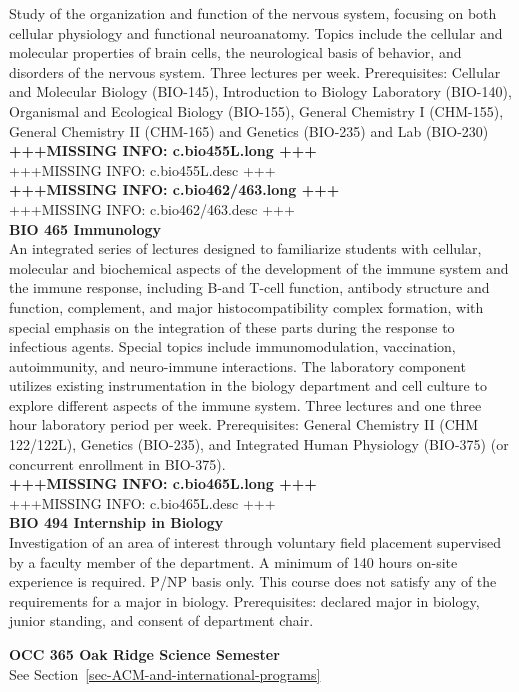 \documentclass[
  letterpaper,
]{scrbook}
\begin{document}
Study of the organization and function of the nervous system, focusing
on both cellular physiology and functional neuroanatomy. Topics include
the cellular and molecular properties of brain cells, the neurological
basis of behavior, and disorders of the nervous system. Three lectures
per week. Prerequisites: Cellular and Molecular Biology (BIO-145),
Introduction to Biology Laboratory (BIO-140), Organismal and Ecological
Biology (BIO-155), General Chemistry I (CHM-155), General Chemistry II
(CHM-165) and Genetics (BIO-235) and Lab (BIO-230)\\
\textbf{+++MISSING INFO: c.bio455L.long +++}\\
+++MISSING INFO: c.bio455L.desc +++\\
\textbf{+++MISSING INFO: c.bio462/463.long +++}\\
+++MISSING INFO: c.bio462/463.desc +++\\
\textbf{BIO 465 Immunology}\\
An integrated series of lectures designed to familiarize students with
cellular, molecular and biochemical aspects of the development of the
immune system and the immune response, including B-and T-cell function,
antibody structure and function, complement, and major
histocompatibility complex formation, with special emphasis on the
integration of these parts during the response to infectious agents.
Special topics include immunomodulation, vaccination, autoimmunity, and
neuro-immune interactions. The laboratory component utilizes existing
instrumentation in the biology department and cell culture to explore
different aspects of the immune system. Three lectures and one three
hour laboratory period per week. Prerequisites: General Chemistry II
(CHM 122/122L), Genetics (BIO-235), and Integrated Human Physiology
(BIO-375) (or concurrent enrollment in BIO-375).\\
\textbf{+++MISSING INFO: c.bio465L.long +++}\\
+++MISSING INFO: c.bio465L.desc +++\\
\textbf{BIO 494 Internship in Biology}\\
Investigation of an area of interest through voluntary field placement
supervised by a faculty member of the department. A minimum of 140 hours
on-site experience is required. P/NP basis only. This course does not
satisfy any of the requirements for a major in biology. Prerequisites:
declared major in biology, junior standing, and consent of department
chair.

\textbf{OCC 365 Oak Ridge Science Semester}\\
See Section~\ref{sec-ACM-and-international-programs}
\end{document}
